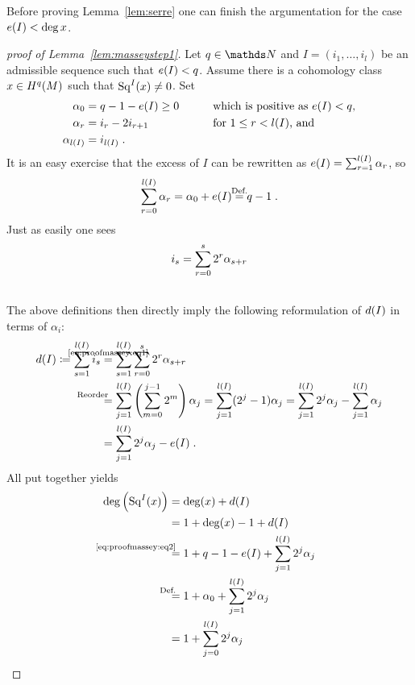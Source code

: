 Before proving Lemma~\ref{lem:serre} one can finish the argumentation for
the case $e(I)<\deg x$.
\begin{proof}[proof of Lemma~\ref{lem:masseystep1}]
  Let $q\in\Nat$ and $I=(i_1,\dotsc,i_l)$ be an admissible sequence such that
  $e(I)<q$.
  Assume there is a cohomology class $x\in H^q(M)$ such that $\mathrm{Sq}^{I}(x)\neq0$.
  Set
  \begin{alignat*}{4}
    \alpha_0 &= q-1-e(I)\geq 0 &\qquad&\text{which is positive as $e(I)<q$,} \\
    \alpha_r &= i_{r}-2i_{r+1}  &&\text{for $1\leq r< l(I)$, and} \\ 
    \alpha_{l(I)} &= i_{l(I)}
    \;.
  \end{alignat*}
  It is an easy exercise that the excess of $I$ can be rewritten as
  $e(I)=\sum_{r=1}^{l(I)}\alpha_r$, so
  \begin{gather}\label{eq:alpha0}
    \sum_{r=0}^{\l(I)}\alpha_r = \alpha_0 + \e(I) \cequalsby{Def.} q-1
    \;.
  \end{gather}
  Just as easily one sees
  \begin{align}\label{eq:proofmassey:eq1}
    i_s
    &= \sum_{r=0}^{s}2^r\alpha_{s+r}\\\notag
  \end{align}
  The above definitions then directly imply the following reformulation
  of $d(I)$ in terms of $\alpha_i$:
  \begin{align}\notag
    \d(I) \coloneqq \sum_{s=1}^{\l(I)}i_s 
    &\cequalsby{\eqref{eq:proofmassey:eq1}}
      \sum_{s=1}^{\l(I)}\sum_{r=0}^{s}2^r\alpha_{s+r}\\\notag
    &\equalsby{Reorder} \sum_{j=1}^{\l(I)}
      \left(\sum_{m=0}^{j-1}2^m\right)\alpha_j
      = \sum_{j=1}^{\l(I)}(2^j-1)\alpha_j 
      = \sum_{j=1}^{\l(I)}2^j\alpha_j
      - \sum_{j=1}^{\l(I)}\alpha_j\\
    \label{eq:proofmassey:eq2}
    &= \sum_{j=1}^{\l(I)}2^j\alpha_j
      - \e(I)
      \;.
  \end{align}
  All put together yields
  \begin{align*}
    \deg\left(\Sq I(x)\right)
    &= \deg(x) + \d(I)\\
    &= 1 + \deg(x) -1 +\d(I) \\
    &\equalsby{\eqref{eq:proofmassey:eq2}}
      1 + q - 1 - \e(I) + \sum_{j=1}^{\l(I)}2^j\alpha_j \\
    &\equalsby{Def.}
      1 + \alpha_0 + \sum_{j=1}^{\l(I)}2^j\alpha_j \\
    &= 1 + \sum_{j=0}^{\l(I)}2^j\alpha_j

\end{align*}
\end{proof}
